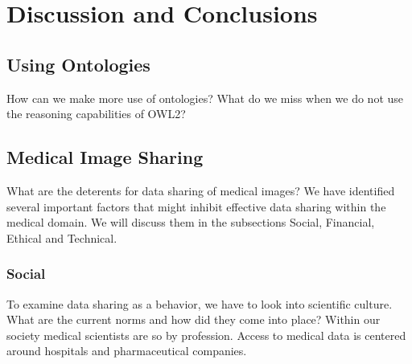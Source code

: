 
\chapter{Discussion and Conclusions} %

\label{Chapter6} %



\section{Using Ontologies}

How can we make more use of ontologies? What do we
miss when we do not use the reasoning capabilities of
OWL2?


\section{Medical Image Sharing}

What are the deterents for data sharing of
medical images? We have identified several
important factors that might inhibit effective data sharing within the
medical domain. We will discuss them in the subsections Social,
Financial, Ethical and Technical.

\subsection{Social}
To examine data sharing as a behavior, we have to look into scientific
culture. What
are the current norms and how did they come into place?  Within our
society medical scientists are so by profession. Access to medical
data is centered around hospitals and pharmaceutical
companies.

